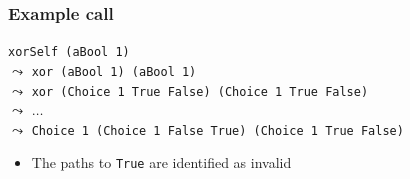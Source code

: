 \documentclass[utf8]{beamer}
\newenvironment{program}{\begin{semiverbatim}\small}{\end{semiverbatim}}
\begin{document}
\begin{frame}[fragile]
\frametitle{Example call}
\begin{example}
\verb!xorSelf (aBool 1)!\\
$\leadsto$ \verb!xor (aBool 1) (aBool 1)!\\
$\leadsto$ \verb!xor (Choice 1 True False) (Choice 1 True False)!\\
$\leadsto$ $\dots$\\
$\leadsto$ \verb!Choice 1 (Choice 1 False True) (Choice 1 True False)!
\end{example}
\begin{itemize}
\item The paths to \verb!True! are identified as invalid
\end{itemize}
\end{frame}


% 
% 
\end{document}
